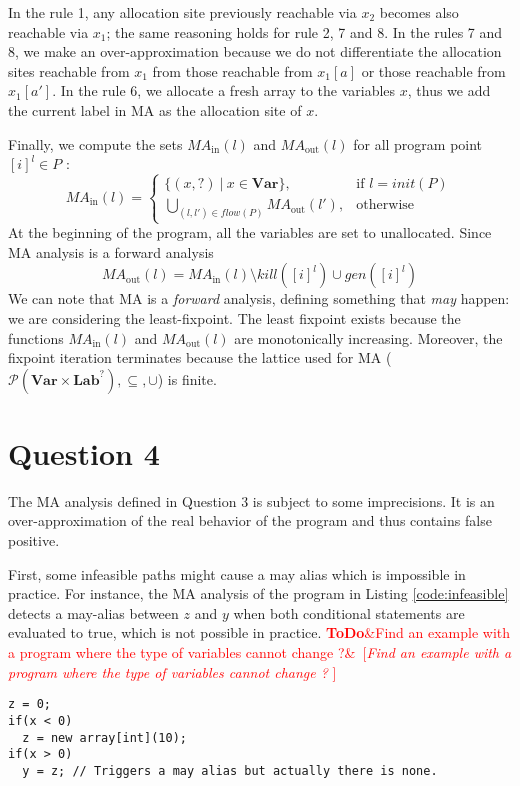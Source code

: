 \documentclass{article}
\newcommand{\todo}[1]{\textcolor{red}{\textbf{ToDo}\ifx&#1&\else ~[\emph{#1} ]~\fi}}
\begin{document}
In the rule 1, any allocation site previously reachable via \(x_2\) becomes also reachable via \(x_1\); the same reasoning holds for rule 2, 7 and 8.
In the rules 7 and 8, we make an over-approximation because we do not differentiate the allocation sites reachable from \(x_1\) from those reachable from \(x_1[a]\) or those reachable from \(x_1[a']\).
In the rule 6, we allocate a fresh array to the variables \(x\), thus we add the current label in MA as the allocation site of \(x\).

Finally, we compute the sets \(M\!A_\text{in}(l)\) and \(M\!A_\text{out}(l)\) for all program point \([i]^l \in P\) :
 \[
    M\!A_\text{in}(l) =
    \begin{cases}
      \{(x,?)\ |\ x \in \textbf{Var}\},                        & \text{if } l=init(P)\\
      \bigcup\limits_{(l,l') \in flow(P)} M\!A_\text{out}(l'), & \text{otherwise}
    \end{cases}
\]
At the beginning of the program, all the variables are set to unallocated. Since MA analysis is a forward analysis
\[
    M\!A_\text{out}(l) = M\!A_\text{in}(l) \setminus kill([i]^l) \cup gen([i]^l)
\]
We can note that MA is a {\em forward} analysis, defining something that {\em may} happen: we are considering the least-fixpoint.
The least fixpoint exists because the functions \(M\!A_\text{in}(l)\) and \(M\!A_\text{out}(l)\) are monotonically increasing.
Moreover, the fixpoint iteration terminates because the lattice used for MA (\(\mathcal{P}(\textbf{Var} \times \textbf{Lab}^?), \subseteq, \cup\)) is finite.

\section*{Question 4}
The MA analysis defined in Question 3 is subject to some imprecisions. It is an over-approximation of the real behavior of the program and thus contains false positive.

First, some infeasible paths might cause a may alias which is impossible in practice.
For instance, the MA analysis of the program in Listing \ref{code:infeasible} detects a may-alias between \(z\) and \(y\) when both conditional statements are evaluated to true, which is not possible in practice.
\todo{Find an example with a program where the type of variables cannot change ?}
\begin{lstlisting}[caption=Example of infeasible execution path causing a may aliasis., label=code:infeasible]
z = 0;
if(x < 0)
  z = new array[int](10);
if(x > 0)
  y = z; // Triggers a may alias but actually there is none.
\end{lstlisting}
\end{document}
